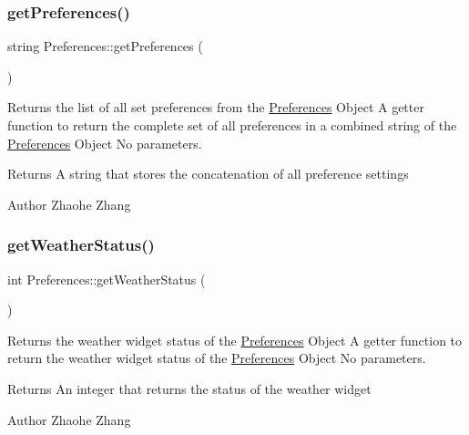 \subsubsection{\texorpdfstring{get\+Preferences()}{getPreferences()}}
{\footnotesize\ttfamily string Preferences\+::get\+Preferences (\begin{DoxyParamCaption}{ }\end{DoxyParamCaption})}



Returns the list of all set preferences from the \mbox{\hyperlink{class_preferences}{Preferences}} Object  A getter function to return the complete set of all preferences in a combined string of the \mbox{\hyperlink{class_preferences}{Preferences}} Object  No parameters. 

\begin{DoxyReturn}{Returns}
A string that stores the concatenation of all preference settings 
\end{DoxyReturn}
\begin{DoxyAuthor}{Author}
Zhaohe Zhang 
\end{DoxyAuthor}
\mbox{\label{class_preferences_a94381281f2cbf83035484eb1704e6b83}} 
\subsubsection{\texorpdfstring{get\+Weather\+Status()}{getWeatherStatus()}}
{\footnotesize\ttfamily int Preferences\+::get\+Weather\+Status (\begin{DoxyParamCaption}{ }\end{DoxyParamCaption})}



Returns the weather widget status of the \mbox{\hyperlink{class_preferences}{Preferences}} Object  A getter function to return the weather widget status of the \mbox{\hyperlink{class_preferences}{Preferences}} Object  No parameters. 

\begin{DoxyReturn}{Returns}
An integer that returns the status of the weather widget 
\end{DoxyReturn}
\begin{DoxyAuthor}{Author}
Zhaohe Zhang 
\end{DoxyAuthor}
\mbox{\label{class_preferences_a69602ab02790104c3c3f49086c4f3463}} 
